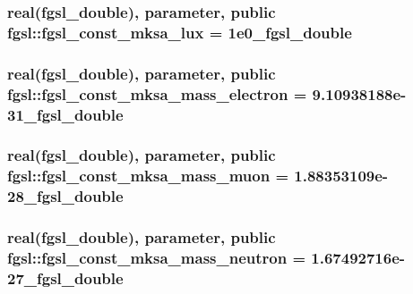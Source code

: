 \hypertarget{classfgsl_a38e1e1db82aff58851133f55d981feed}{
\subsubsection[{fgsl\-\_\-const\-\_\-mksa\-\_\-lux}]{\setlength{\rightskip}{0pt plus 5cm}real({\bf fgsl\-\_\-double}), parameter, public fgsl\-::fgsl\-\_\-const\-\_\-mksa\-\_\-lux = 1e0\-\_\-fgsl\-\_\-double}}\label{classfgsl_a38e1e1db82aff58851133f55d981feed}
\hypertarget{classfgsl_a9b37f99c3856817b93dd18bc94b81725}{
\subsubsection[{fgsl\-\_\-const\-\_\-mksa\-\_\-mass\-\_\-electron}]{\setlength{\rightskip}{0pt plus 5cm}real({\bf fgsl\-\_\-double}), parameter, public fgsl\-::fgsl\-\_\-const\-\_\-mksa\-\_\-mass\-\_\-electron = 9.\-10938188e-\/31\-\_\-fgsl\-\_\-double}}\label{classfgsl_a9b37f99c3856817b93dd18bc94b81725}
\hypertarget{classfgsl_afcace800f07f1c2e9703336d2ff02ba4}{
\subsubsection[{fgsl\-\_\-const\-\_\-mksa\-\_\-mass\-\_\-muon}]{\setlength{\rightskip}{0pt plus 5cm}real({\bf fgsl\-\_\-double}), parameter, public fgsl\-::fgsl\-\_\-const\-\_\-mksa\-\_\-mass\-\_\-muon = 1.\-88353109e-\/28\-\_\-fgsl\-\_\-double}}\label{classfgsl_afcace800f07f1c2e9703336d2ff02ba4}
\hypertarget{classfgsl_a4480f5ff7a83600820b4cdaa8aff929e}{
\subsubsection[{fgsl\-\_\-const\-\_\-mksa\-\_\-mass\-\_\-neutron}]{\setlength{\rightskip}{0pt plus 5cm}real({\bf fgsl\-\_\-double}), parameter, public fgsl\-::fgsl\-\_\-const\-\_\-mksa\-\_\-mass\-\_\-neutron = 1.\-67492716e-\/27\-\_\-fgsl\-\_\-double}}\label{classfgsl_a4480f5ff7a83600820b4cdaa8aff929e}
